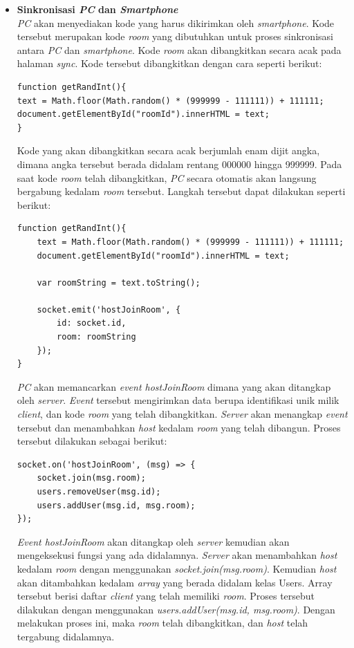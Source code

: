 \begin{enumerate}
\begin{itemize}
		\item \textbf{Sinkronisasi \textit{PC} dan \textit{Smartphone}} \\
		\textit{PC} akan menyediakan kode yang harus dikirimkan oleh \textit{smartphone}. Kode tersebut merupakan kode \textit{room} yang dibutuhkan untuk proses sinkronisasi antara \textit{PC} dan \textit{smartphone}. Kode \textit{room} akan dibangkitkan secara acak pada halaman \textit{sync}. Kode tersebut dibangkitkan dengan cara seperti berikut:
\begin{lstlisting}[caption={proses membangkitkan kode \textit{room}}, label={lst:bangkit_kode}, captionpos=b]
function getRandInt(){
text = Math.floor(Math.random() * (999999 - 111111)) + 111111;
document.getElementById("roomId").innerHTML = text;
}
\end{lstlisting}
		Kode yang akan dibangkitkan secara acak berjumlah enam dijit angka, dimana angka tersebut berada didalam rentang 000000 hingga 999999. Pada saat kode \textit{room} telah dibangkitkan, \textit{PC} secara otomatis akan langsung bergabung kedalam \textit{room} tersebut. Langkah tersebut dapat dilakukan seperti berikut:
\begin{lstlisting}[caption={proses \textit{host} bergabung kedalam room}, label={host_gabung}, captionpos=b]
function getRandInt(){
	text = Math.floor(Math.random() * (999999 - 111111)) + 111111;
	document.getElementById("roomId").innerHTML = text;

	var roomString = text.toString();

	socket.emit('hostJoinRoom', {
		id: socket.id,
		room: roomString
	});
}
\end{lstlisting}
		\textit{PC} akan memancarkan \textit{event hostJoinRoom} dimana yang akan ditangkap oleh \textit{server}. \textit{Event} tersebut mengirimkan data berupa identifikasi unik milik \textit{client}, dan kode \textit{room} yang telah dibangkitkan. \textit{Server} akan menangkap \textit{event} tersebut dan menambahkan \textit{host} kedalam \textit{room} yang telah dibangun. Proses tersebut dilakukan sebagai berikut:
\begin{lstlisting}[caption={server menerima \textit{event} dari \textit{host}}, label={lst:server_acc_host}, captionpos=b]
socket.on('hostJoinRoom', (msg) => {
	socket.join(msg.room);
	users.removeUser(msg.id);
	users.addUser(msg.id, msg.room);
});
\end{lstlisting}
		\textit{Event hostJoinRoom} akan ditangkap oleh \textit{server} kemudian akan mengeksekusi fungsi yang ada didalamnya. \textit{Server} akan menambahkan \textit{host} kedalam \textit{room} dengan menggunakan \textit{socket.join(msg.room)}. Kemudian \textit{host} akan ditambahkan kedalam \textit{array} yang berada didalam kelas Users. Array tersebut berisi daftar \textit{client} yang telah memiliki \textit{room}. Proses tersebut dilakukan dengan menggunakan \textit{users.addUser(msg.id, msg.room)}. Dengan melakukan proses ini, maka \textit{room} telah dibangkitkan, dan \textit{host} telah tergabung didalamnya.
		

\end{itemize}
\end{enumerate}
